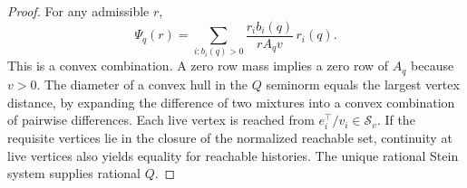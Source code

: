 \begin{proof}
For any admissible $r$,
\[
 \Psi_q(r)=\sum_{i:b_i(q)>0}\frac{r_i b_i(q)}{rA_qv}\,r_i(q).
\]
This is a convex combination. A zero row mass implies a zero row of $A_q$ because $v>0$. The diameter of a convex hull in the $Q$ seminorm equals the largest vertex distance, by expanding the difference of two mixtures into a convex combination of pairwise differences. Each live vertex is reached from $e_i^\top/v_i\in\mathcal S_v$. If the requisite vertices lie in the closure of the normalized reachable set, continuity at live vertices also yields equality for reachable histories. The unique rational Stein system supplies rational $Q$.
\end{proof}
